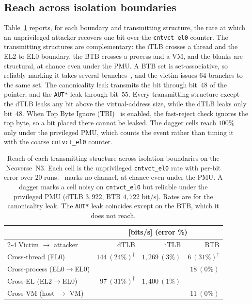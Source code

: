 \documentclass[letterpaper,twocolumn,10pt]{article}
\newcommand{\xmark}{\ding{55}}
\theoremstyle{definition}
\begin{document}
\subsection{Reach across isolation boundaries}
\label{sec:eval-reach}
Table~\ref{tab:reach} reports, for each boundary and transmitting structure, the rate at which an unprivileged
attacker recovers one bit over the \texttt{cntvct\_el0} counter. The transmitting structures are complementary:
the iTLB crosses a thread and the EL2-to-EL0 boundary, the BTB crosses a process and a VM, and the
blanks are structural, at chance even under the PMU. A BTB set is set-associative, so
reliably marking it takes several branches~\cite{indirector}, and the victim issues $64$ branches to
the same set. The canonicality leak transmits the bit through bit~48 of the pointer, and the
\texttt{AUT*} leak through bit~55. Every transmitting structure except the dTLB leaks any bit above the
virtual-address size, while the dTLB leaks only bit~48. When Top Byte Ignore (TBI)~\cite{arm_tbi} is
enabled, the fast-reject check ignores the top byte, so a bit placed there cannot be leaked. The
dagger cells reach $100\%$ only under the privileged PMU, which counts the event rather than timing
it with the coarse \texttt{cntvct\_el0} counter.

\begin{table}[t]\centering\footnotesize
\setlength{\tabcolsep}{5pt}
\caption{Reach of each transmitting structure across isolation boundaries on the Neoverse~N3. Each cell is the
unprivileged \texttt{cntvct\_el0} rate with per-bit error over $20$ runs. \xmark\ marks no
channel, at chance even under the PMU. A dagger marks a cell noisy on \texttt{cntvct\_el0} but reliable under the privileged PMU (dTLB
$3{,}922$, BTB $4{,}722$ bit/s). Rates are for the canonicality leak. The \texttt{AUT*} leak
coincides except on the BTB, which it does not reach.}
\label{tab:reach}
\begin{tabular}{@{}l r r r@{}}
\toprule
 & \multicolumn{3}{c}{[bits/s] (error \%)} \\
\cmidrule(lr){2-4}
Victim $\to$ attacker & dTLB & iTLB & BTB \\
\midrule
Cross-thread (EL0)                & $144\ (24\%)^{\dagger}$ & $1{,}269\ (3\%)$ & $6\ (31\%)^{\dagger}$ \\
Cross-process (EL0$\to$EL0)       & \xmark                  & \xmark           & $18\ (0\%)$ \\
Cross-EL (EL2$\to$EL0)            & $97\ (31\%)^{\dagger}$  & $1{,}400\ (1\%)$ & \xmark \\
Cross-VM (host $\to$ VM)          & \xmark                  & \xmark           & $11\ (0\%)$ \\
\bottomrule
\end{tabular}
\end{table}
\end{document}
